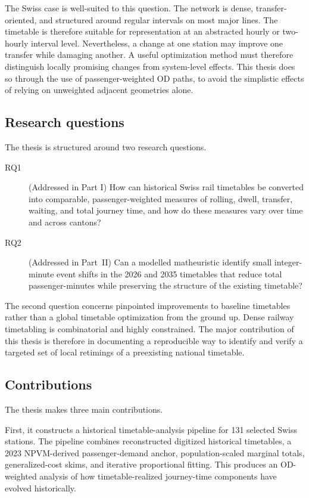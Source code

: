 \documentclass[preprint,12pt]{elsarticle}
\begin{document}
The Swiss case is well-suited to this question. The network is dense, transfer-oriented, and structured around regular intervals on most major lines. The timetable is therefore suitable for representation at an abstracted hourly or two-hourly interval level. Nevertheless, a change at one station may improve one transfer while damaging another. A useful optimization method must therefore distinguish locally promising changes from system-level effects. This thesis does so through the use of passenger-weighted OD paths, to avoid the simplistic effects of relying on unweighted adjacent geometries alone.

\subsection{Research questions}\label{sec:research-questions}

The thesis is structured around two research questions.

\begin{description}
    \item[RQ1] (Addressed in Part I) How can historical Swiss rail timetables be converted into comparable, passenger-weighted measures of rolling, dwell, transfer, waiting, and total journey time, and how do these measures vary over time and across cantons?

    \item[RQ2] (Addressed in Part~II) Can a modelled matheuristic identify small integer-minute event shifts in the 2026 and 2035 timetables that reduce total passenger-minutes while preserving the structure of the existing timetable?
\end{description}

The second question concerns pinpointed improvements to baseline timetables rather than a global timetable optimization from the ground up. Dense railway timetabling is combinatorial and highly constrained. The major contribution of this thesis is therefore in documenting a reproducible way to identify and verify a targeted set of local retimings of a preexisting national timetable.
\subsection{Contributions}\label{sec:contributions}

The thesis makes three main contributions.

First, it constructs a historical timetable-analysis pipeline for 131 selected Swiss stations. The pipeline combines reconstructed digitized historical timetables, a 2023 NPVM-derived passenger-demand anchor, population-scaled marginal totals, generalized-cost skims, and iterative proportional fitting. This produces an OD-weighted analysis of how timetable-realized journey-time components have evolved historically.
\end{document}
